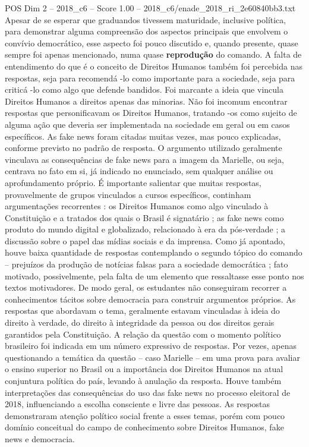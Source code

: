 \begin{textsample}{POS Dim 2 – 2018\_c6 – Score 1.00 – 2018\_c6/enade\_2018\_ri\_2e60840bb3.txt}
Apesar de se esperar que graduandos tivessem maturidade, inclusive política, para demonstrar alguma compreensão dos aspectos principais que envolvem o convívio democrático, esse aspecto foi pouco discutido e, quando presente, quase sempre foi apenas mencionado, numa quase \textbf{reprodução} do comando.
A falta de entendimento do que é o conceito de Direitos Humanos também foi percebida nas respostas, seja para recomendá -lo como importante para a sociedade, seja para criticá -lo como algo que defende bandidos.
Foi marcante a ideia que vincula Direitos Humanos a direitos apenas das minorias.
Não foi incomum encontrar respostas que personificavam os Direitos Humanos, tratando -os como sujeito de alguma ação que deveria ser implementada na sociedade em geral ou em casos específicos.
As fake news foram citadas muitas vezes, mas pouco explicadas, conforme previsto no padrão de resposta.
O argumento utilizado geralmente vinculava as consequências de fake news para a imagem da Marielle, ou seja, centrava no fato em si, já indicado no enunciado, sem qualquer análise ou aprofundamento próprio.
É importante salientar que muitas respostas, provavelmente de grupos vinculados a cursos específicos, continham argumentações recorrentes : os Direitos Humanos como algo vinculado à Constituição e a tratados dos quais o Brasil é signatário ; as fake news como produto do mundo digital e globalizado, relacionado à era da pós-verdade ; a discussão sobre o papel das mídias sociais e da imprensa.
Como já apontado, houve baixa quantidade de respostas contemplando o segundo tópico do comando – prejuízos da produção de notícias falsas para a sociedade democrática ; fato motivado, possivelmente, pela falta de um elemento que ressaltasse esse ponto nos textos motivadores.
De modo geral, os estudantes não conseguiram recorrer a conhecimentos tácitos sobre democracia para construir argumentos próprios.
As respostas que abordavam o tema, geralmente estavam vinculadas à ideia do direito à verdade, do direito à integridade da pessoa ou dos direitos gerais garantidos pela Constituição.
A relação da questão com o momento político brasileiro foi indicada em um número expressivo de respostas.
Por vezes, apenas questionando a temática da questão – caso Marielle – em uma prova para avaliar o ensino superior no Brasil ou a importância dos Direitos Humanos na atual conjuntura política do país, levando à anulação da resposta.
Houve também interpretações das consequências do uso das fake news no processo eleitoral de 2018, influenciando a escolha consciente e livre das pessoas.
As respostas demonstraram atenção político social frente a esses temas, porém com pouco domínio conceitual do campo de conhecimento sobre Direitos Humanos, fake news e democracia.

\end{textsample}
